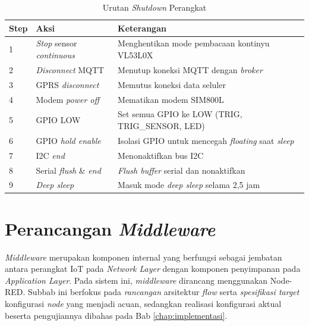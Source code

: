 \begin{table}[H]
  \caption{Urutan \textit{Shutdown} Perangkat}
  \label{tab:urutan-shutdown}
  \begin{tabularx}{\textwidth}{| l | l | X |}
    \hline
    \textbf{Step} & \textbf{Aksi} & \textbf{Keterangan} \\
    \hline
    1 & \textit{Stop} sensor \textit{continuous} & Menghentikan mode pembacaan kontinyu VL53L0X \\
    \hline
    2 & \textit{Disconnect} MQTT & Menutup koneksi MQTT dengan \textit{broker} \\
    \hline
    3 & GPRS \textit{disconnect} & Memutus koneksi data seluler \\
    \hline
    4 & Modem \textit{power off} & Mematikan modem SIM800L \\
    \hline
    5 & GPIO LOW & Set semua GPIO ke LOW (TRIG, TRIG\_SENSOR, LED) \\
    \hline
    6 & GPIO \textit{hold enable} & Isolasi GPIO untuk mencegah \textit{floating} saat \textit{sleep} \\
    \hline
    7 & I2C \textit{end} & Menonaktifkan bus I2C \\
    \hline
    8 & Serial \textit{flush} \& \textit{end} & \textit{Flush buffer} serial dan nonaktifkan \\
    \hline
    9 & \textit{Deep sleep} & Masuk mode \textit{deep sleep} selama 2,5 jam \\
    \hline
  \end{tabularx}
\end{table}

\section{Perancangan \textit{Middleware}}
\label{sec:perancangan-middleware}

\textit{Middleware} merupakan komponen internal yang berfungsi sebagai jembatan antara perangkat IoT pada \textit{Network Layer} dengan komponen penyimpanan pada \textit{Application Layer}. Pada sistem ini, \textit{middleware} dirancang menggunakan Node-RED. Subbab ini berfokus pada \emph{rancangan} arsitektur \textit{flow} serta \emph{spesifikasi target} konfigurasi \textit{node} yang menjadi acuan, sedangkan realisasi konfigurasi aktual beserta pengujiannya dibahas pada Bab \ref{chap:implementasi}.

